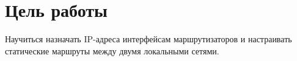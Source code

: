 \section{Цель работы}
Научиться назначать IP-адреса интерфейсам маршрутизаторов и настраивать статические
маршруты между двумя локальными сетями.
